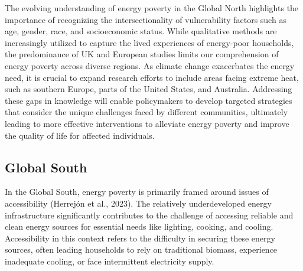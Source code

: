 \documentclass[
  twoside,
  openright,
  degree    = master,               %
  language  = english,              %
  fontset   = overleaf,             %
  watermark = true,                 %
  doi       = true,                 %
]{ntuthesis}
\begin{document}
The evolving understanding of energy poverty in the Global North
highlights the importance of recognizing the intersectionality of
vulnerability factors such as age, gender, race, and socioeconomic
status. While qualitative methods are increasingly utilized to capture
the lived experiences of energy-poor households, the predominance of UK
and European studies limits our comprehension of energy poverty across
diverse regions. As climate change exacerbates the energy need, it is
crucial to expand research efforts to include areas facing extreme heat,
such as southern Europe, parts of the United States, and Australia.
Addressing these gaps in knowledge will enable policymakers to develop
targeted strategies that consider the unique challenges faced by
different communities, ultimately leading to more effective
interventions to alleviate energy poverty and improve the quality of
life for affected individuals.

\hypertarget{global-south}{%
\subsection{Global South}\label{global-south}}

In the Global South, energy poverty is primarily framed around issues of
accessibility (Herrejón et al., 2023). The relatively underdeveloped
energy infrastructure significantly contributes to the challenge of
accessing reliable and clean energy sources for essential needs like
lighting, cooking, and cooling. Accessibility in this context refers to
the difficulty in securing these energy sources, often leading
households to rely on traditional biomass, experience inadequate
cooling, or face intermittent electricity supply.
\end{document}
